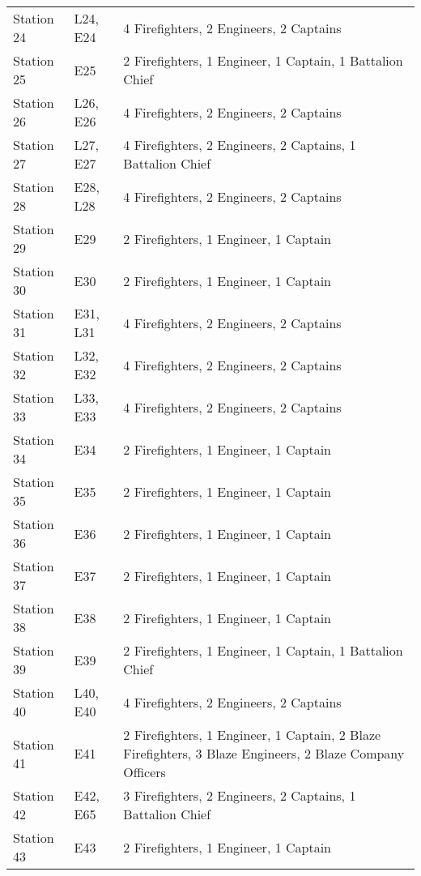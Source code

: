 \begin{longtable}{p{} p{} p{}}
    Station 24 & L24, E24 & 4 Firefighters, 2 Engineers, 2 Captains \\
    Station 25 & E25 & 2 Firefighters, 1 Engineer, 1 Captain, 1 Battalion Chief \\
    Station 26 & L26, E26 & 4 Firefighters, 2 Engineers, 2 Captains \\
    Station 27 & L27, E27 & 4 Firefighters, 2 Engineers, 2 Captains, 1 Battalion Chief \\
    Station 28 & E28, L28 & 4 Firefighters, 2 Engineers, 2 Captains \\
    Station 29 & E29 & 2 Firefighters, 1 Engineer, 1 Captain \\
    Station 30 & E30 & 2 Firefighters, 1 Engineer, 1 Captain \\
    Station 31 & E31, L31 & 4 Firefighters, 2 Engineers, 2 Captains \\
    Station 32 & L32, E32 & 4 Firefighters, 2 Engineers, 2 Captains \\
    Station 33 & L33, E33 & 4 Firefighters, 2 Engineers, 2 Captains \\
    Station 34 & E34 & 2 Firefighters, 1 Engineer, 1 Captain \\
    Station 35 & E35 & 2 Firefighters, 1 Engineer, 1 Captain \\
    Station 36 & E36 & 2 Firefighters, 1 Engineer, 1 Captain \\
    Station 37 & E37 & 2 Firefighters, 1 Engineer, 1 Captain \\
    Station 38 & E38 & 2 Firefighters, 1 Engineer, 1 Captain \\
    Station 39 & E39 & 2 Firefighters, 1 Engineer, 1 Captain, 1 Battalion Chief \\
    Station 40 & L40, E40 & 4 Firefighters, 2 Engineers, 2 Captains \\
    Station 41 & E41 & 2 Firefighters, 1 Engineer, 1 Captain, 2 Blaze Firefighters, 3 Blaze Engineers, 2 Blaze Company Officers \\
    Station 42 & E42, E65 & 3 Firefighters, 2 Engineers, 2 Captains, 1 Battalion Chief \\
    Station 43 & E43 & 2 Firefighters, 1 Engineer, 1 Captain \\
\end{longtable}
\parbox{\textwidth}{}


